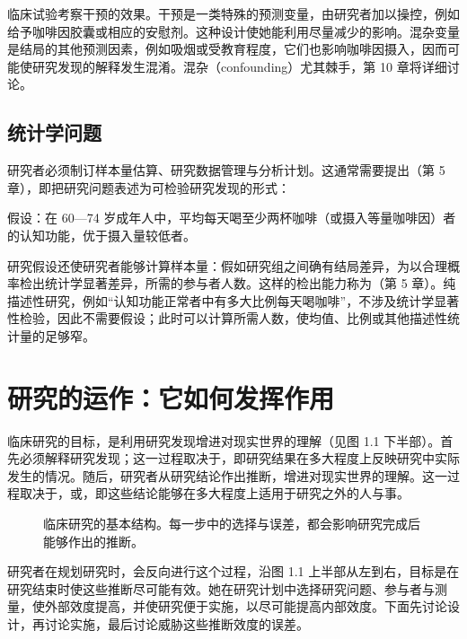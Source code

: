 临床试验考察干预的效果。干预是一类特殊的预测变量，由研究者加以操控，例如给予咖啡因胶囊或相应的安慰剂。这种设计使她能利用尽量减少的影响。混杂变量是结局的其他预测因素，例如吸烟或受教育程度，它们也影响咖啡因摄入，因而可能使研究发现的解释发生混淆。混杂（confounding）尤其棘手，第 10 章将详细讨论。

\subsection{统计学问题}
研究者必须制订样本量估算、研究数据管理与分析计划。这通常需要提出（第 5 章），即把研究问题表述为可检验研究发现的形式：
\begin{studyquote}
假设：在 60—74 岁成年人中，平均每天喝至少两杯咖啡（或摄入等量咖啡因）者的认知功能，优于摄入量较低者。
\end{studyquote}
研究假设还使研究者能够计算样本量：假如研究组之间确有结局差异，为以合理概率检出统计学显著差异，所需的参与者人数。这样的检出能力称为（第 5 章）。纯描述性研究，例如“认知功能正常者中有多大比例每天喝咖啡”，不涉及统计学显著性检验，因此不需要假设；此时可以计算所需人数，使均值、比例或其他描述性统计量的足够窄。

\section{研究的运作：它如何发挥作用}
临床研究的目标，是利用研究发现增进对现实世界的理解（见图 1.1 下半部）。首先必须解释研究发现；这一过程取决于，即研究结果在多大程度上反映研究中实际发生的情况。随后，研究者从研究结论作出推断，增进对现实世界的理解。这一过程取决于，或，即这些结论能够在多大程度上适用于研究之外的人与事。

\par
\begin{figure}[htbp]\centering\chonebasicflow
\caption{临床研究的基本结构。每一步中的选择与误差，都会影响研究完成后能够作出的推断。}\label{fig:01_01}\end{figure}\par
研究者在规划研究时，会反向进行这个过程，沿图 1.1 上半部从左到右，目标是在研究结束时使这些推断尽可能有效。她在研究计划中选择研究问题、参与者与测量，使外部效度提高，并使研究便于实施，以尽可能提高内部效度。下面先讨论设计，再讨论实施，最后讨论威胁这些推断效度的误差。

